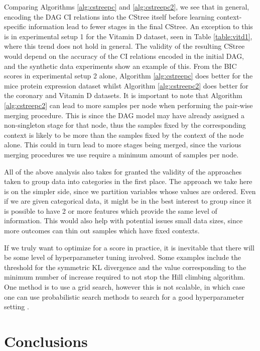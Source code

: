 \documentclass{tufte-book}
\begin{document}
Comparing Algorithms \ref{alg:cstreepc} and \ref{alg:cstreepc2}, we see that in general, encoding the DAG CI relations into the CStree itself before learning context-specific information lead to fewer stages in the final CStree. An exception to this is in experimental setup 1 for the Vitamin D dataset, seen in Table \ref{table:vitd1}, where this trend does not hold in general. The validity of the resulting CStree would depend on the accuracy of the CI relations encoded in the initial DAG, and the synthetic data experiments show an example of this. From the BIC scores in experimental setup 2 alone, Algorithm \ref{alg:cstreepc} does better for the mice protein expression dataset whilst Algorithm \ref{alg:cstreepc2} does better for the coronary and Vitamin D datasets.  It is important to note that Algorithm \ref{alg:cstreepc2} can lead to more samples per node when performing the pair-wise merging procedure. This is since the DAG model may have already assigned a non-singleton stage for that node, thus the samples fixed by the corresponding context is likely to be more than the samples fixed by the context of the node alone. This could in turn lead to more stages being merged, since the various merging procedures we use require a minimum amount of samples per node.


All of the above analysis also takes for granted the validity of the approaches taken to group data into categories in the first place. The approach we take here is on the simpler side, since we partition variables whose values are ordered. Even if we are given categorical data, it might be in the best interest to group since it is possible to have 2 or more features which provide the same level of information. This would also help with potential issues small data sizes, since more outcomes can thin out samples which have fixed contexts.


If we truly want to optimize for a score in practice, it is inevitable that there will be some level of hyperparameter tuning involved. Some examples include the threshold for the symmetric KL divergence and the value corresponding to the minimum number of increase required to not stop the Hill climbing algorithm. One method is to use a grid search, however this is not scalable, in which case one can use probabilistic search methods to search for a good hyperparameter setting \cite{oh-2019-combin-bayes}.


\chapter{Conclusions}
\label{sec:org3dba4ba}
\end{document}
